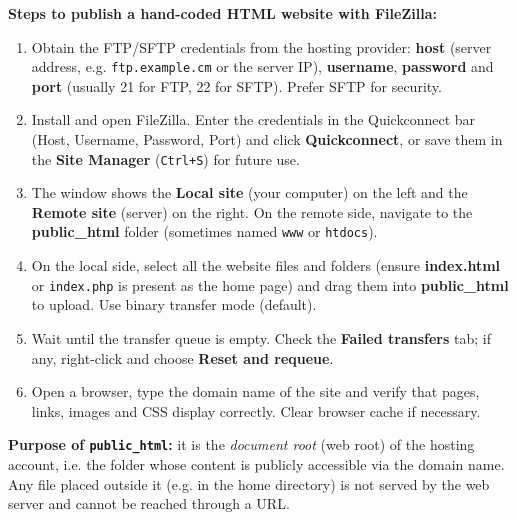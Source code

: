\documentclass[11pt]{article}
\begin{document}
\begin{corrige}
\textbf{Steps to publish a hand-coded HTML website with FileZilla:}
\begin{enumerate}
\item Obtain the FTP/SFTP credentials from the hosting provider: \textbf{host} (server address, e.g. \texttt{ftp.example.cm} or the server IP), \textbf{username}, \textbf{password} and \textbf{port} (usually 21 for FTP, 22 for SFTP). Prefer SFTP for security.
\item Install and open FileZilla. Enter the credentials in the Quickconnect bar (Host, Username, Password, Port) and click \textbf{Quickconnect}, or save them in the \textbf{Site Manager} (\texttt{Ctrl+S}) for future use.
\item The window shows the \textbf{Local site} (your computer) on the left and the \textbf{Remote site} (server) on the right. On the remote side, navigate to the \textbf{public\_html} folder (sometimes named \texttt{www} or \texttt{htdocs}).
\item On the local side, select all the website files and folders (ensure \textbf{index.html} or \texttt{index.php} is present as the home page) and drag them into \textbf{public\_html} to upload. Use binary transfer mode (default).
\item Wait until the transfer queue is empty. Check the \textbf{Failed transfers} tab; if any, right-click and choose \textbf{Reset and requeue}.
\item Open a browser, type the domain name of the site and verify that pages, links, images and CSS display correctly. Clear browser cache if necessary.
\end{enumerate}
\textbf{Purpose of \texttt{public\_html}:} it is the \emph{document root} (web root) of the hosting account, i.e. the folder whose content is publicly accessible via the domain name. Any file placed outside it (e.g. in the home directory) is not served by the web server and cannot be reached through a URL.
\end{corrige}
\end{document}
